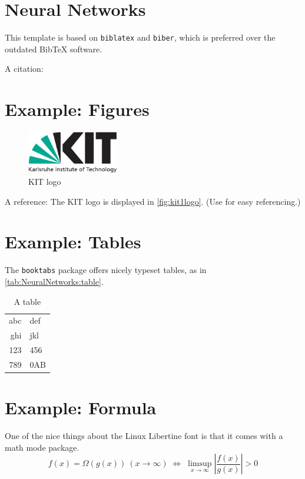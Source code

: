 \section{Neural Networks}
\label{sec:Fundamentals:Neural Networks}
This template is based on \texttt{biblatex} and \texttt{biber}, which is preferred over the
outdated Bib\TeX{} software.

A citation: \cite{becker2008a} 

\section{Example: Figures}
\label{sec:Example:Figures}
\begin{figure}
\centering
\includegraphics[width=4cm]{logos/kitlogo_en_cmyk.pdf}
\caption{KIT logo}
\label{fig:kit1logo}
\end{figure}

A reference: The KIT logo is displayed in \autoref{fig:kit1logo}. 
(Use  for easy referencing.) 

\section{Example: Tables}
The \texttt{booktabs} package offers nicely typeset tables, as in \autoref{tab:NeuralNetworks:table}.

\label{sec:NeuralNetworks:Tables}
\begin{table}
\centering
\begin{tabular}{r l}
\toprule
abc & def\\
ghi & jkl\\
\midrule
123 & 456\\
789 & 0AB\\
\bottomrule
\end{tabular}
\caption{A table}
\label{tab:NeuralNetworks:table}
\end{table}

\section{Example: Formula}
One of the nice things about the Linux Libertine font is that it comes with
a math mode package.
\begin{displaymath}
f(x)=\Omega(g(x))\ (x\rightarrow\infty)\;\Leftrightarrow\;
\limsup_{x \to \infty} \left|\frac{f(x)}{g(x)}\right|> 0
\end{displaymath}

